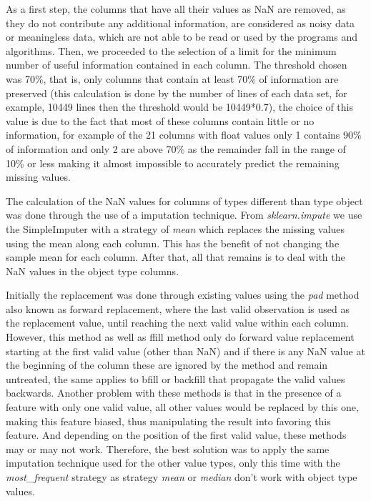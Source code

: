 \hspace{10px} As a first step, the columns that have all their values as NaN are removed, as they do not contribute any additional information, are considered as noisy data or meaningless data, which are not able to be read or used by the programs and algorithms. Then, we proceeded to the selection of a limit for the minimum number of useful information contained in each column. The threshold chosen was 70\%, that is, only columns that contain at least 70\% of information are preserved (this calculation is done by the number of lines of each data set, for example, 10449 lines then the threshold would be 10449*0.7), the choice of this value is due to the fact that most of these columns contain little or no information, for example of the 21 columns with float values only 1 contains 90\% of information and only 2 are above 70\% as the remainder fall in the range of 10\% or less making it almost impossible to accurately predict the remaining missing values. 

The calculation of the NaN values for columns of types different than type object was done through the use of a imputation technique. From \textit{sklearn.impute} we use the SimpleImputer with a strategy of \textit{mean} which replaces the missing values using the mean along each column. This has the benefit of not changing the sample mean for each column. After that, all that remains is to deal with the NaN values in the object type columns.

Initially the replacement was done through existing values using the \textit{pad} method also known as forward replacement, where the last valid observation is used as the replacement value, until reaching the next valid value within each column. However, this method as well as ffill method only do forward value replacement starting at the first valid value (other than NaN) and if there is any NaN value at the beginning of the column these are ignored by the method and remain untreated, the same applies to bfill or backfill that propagate the valid values backwards. Another problem with these methods is that in the presence of a feature with only one valid value, all other values would be replaced by this one, making this feature biased, thus manipulating the result into favoring this feature. And depending on the position of the first valid value, these methods may or may not work. Therefore, the best solution was to apply the same imputation technique used for the other value types, only this time with the \textit{most\_frequent} strategy as strategy \textit{mean} or \textit{median} don't work with object type values.

